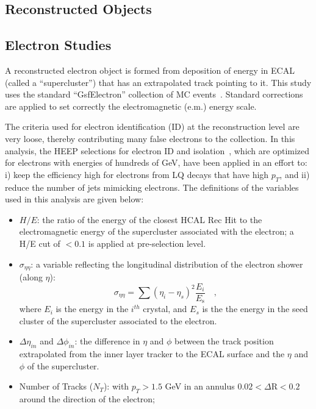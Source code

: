 \documentclass{cmspaper}
\begin{document}
\begin{linenumbers}
\section{Reconstructed Objects} 

\subsection{Electron Studies} \label{sec:electrons}
A reconstructed electron object is formed from deposition of energy in ECAL (called a ``supercluster'') that has an 
extrapolated track pointing to it. This study uses the standard ``GsfElectron'' collection of MC events~\cite{GSFele}.
Standard corrections are applied to set correctly the electromagnetic (e.m.) energy scale.

The criteria used for electron identification (ID) at the reconstruction level are very loose, thereby contributing many false electrons 
to the collection. In this analysis, the HEEP selections for electron ID and isolation~\cite{HEEPNOTE}, which are optimized for 
electrons with energies of hundreds of GeV, have been applied in an effort to: i) keep the efficiency high for electrons 
from LQ decays that have high $p_{T}$, and ii) reduce the number of jets mimicking electrons.
The definitions of the variables used in this analysis are given below:
%
\begin{itemize}
%
\item $H/E$: the ratio of the energy of the closest HCAL Rec Hit to the electromagnetic energy of 
the supercluster associated with the electron; a H/E cut of $<0.1$ is applied at pre-selection level.
%
\item $\sigma_{\eta\eta}$: a variable reflecting the longitudinal distribution of the electron shower (along $\eta$):
\begin{displaymath}
\sigma_{\eta\eta} = \sum( \eta_i - \eta_s )^2 \frac{E_i}{E_{\mbox{s}}} \quad ,
\end{displaymath}
where $E_i$ is the energy in the $i^{th}$ crystal, and $E_s$ is the the energy in the seed cluster of the supercluster associated to the electron.
%
\item $\Delta\eta_{in}$ and $\Delta\phi_{in}$: the difference in $\eta$ and $\phi$ between the track position extrapolated from 
the inner layer tracker to the ECAL surface and the $\eta$ and $\phi$ of the supercluster.
%
\item Number of Tracks ($N_T$): with $p_{T}>1.5$ GeV in an annulus $0.02 < \Delta\mbox{R} < 0.2 $ around the direction of the electron;

\end{itemize}
\end{linenumbers}
\end{document}
